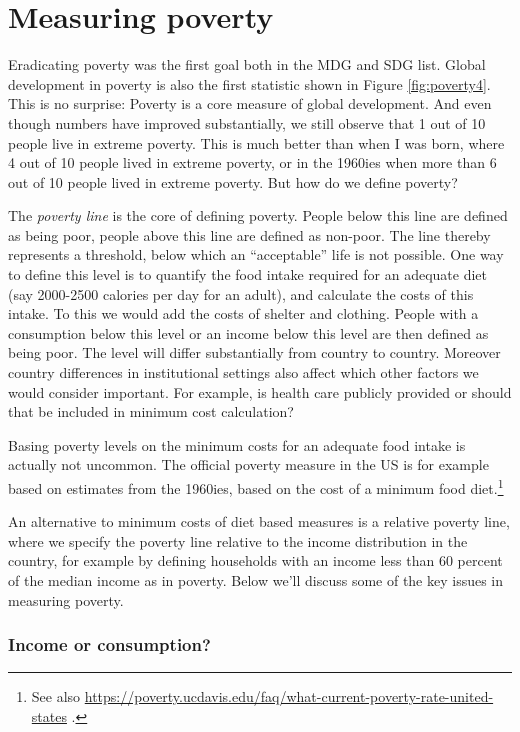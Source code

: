 \documentclass[
]{book}
\begin{document}
\hypertarget{measuring-poverty}{%
\section{Measuring poverty}\label{measuring-poverty}}

Eradicating poverty was the first goal both in the MDG and SDG list. Global development in poverty is also the first statistic shown in Figure \ref{fig:poverty4}. This is no surprise: Poverty is a core measure of global development. And even though numbers have improved substantially, we still observe that 1 out of 10 people live in extreme poverty. This is much better than when I was born, where 4 out of 10 people lived in extreme poverty, or in the 1960ies when more than 6 out of 10 people lived in extreme poverty. But how do we define poverty?

The \emph{poverty line} is the core of defining poverty. People below this line are defined as being poor, people above this line are defined as non-poor. The line thereby represents a threshold, below which an ``acceptable'' life is not possible. One way to define this level is to quantify the food intake required for an adequate diet (say 2000-2500 calories per day for an adult), and calculate the costs of this intake. To this we would add the costs of shelter and clothing. People with a consumption below this level or an income below this level are then defined as being poor. The level will differ substantially from country to country. Moreover country differences in institutional settings also affect which other factors we would consider important. For example, is health care publicly provided or should that be included in minimum cost calculation?

Basing poverty levels on the minimum costs for an adequate food intake is actually not uncommon. The official poverty measure in the US is for example based on estimates from the 1960ies, based on the cost of a minimum food diet.\footnote{See also \url{https://poverty.ucdavis.edu/faq/what-current-poverty-rate-united-states} .}

An alternative to minimum costs of diet based measures is a relative poverty line, where we specify the poverty line relative to the income distribution in the country, for example by defining households with an income less than 60 percent of the median income as in poverty. Below we'll discuss some of the key issues in measuring poverty.

\hypertarget{income-or-consumption}{%
\subsubsection*{Income or consumption?}\label{income-or-consumption}}
\end{document}
